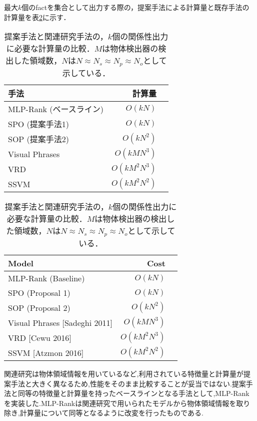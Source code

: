 最大$k$個のfactを集合として出力する際の，提案手法による計算量と既存手法の計算量を表\ref{table:calc-cost}に示す．
\begin{table}
\begin{center}
\caption{提案手法と関連研究手法の，$k$個の関係性出力に必要な計算量の比較．$M$は物体検出器の検出した領域数，$N$は$N \approx N_s \approx N_p \approx N_o$として示している．}
\label{table:calc-cost}
\begin{tabular}{lrr}
\toprule
手法 &  計算量 \\
\midrule
MLP-Rank (ベースライン)										&	$O(kN)$		\\
SPO	(提案手法1)												&	$O(kN)$		\\
SOP (提案手法2)												&	$O(kN^2)$	\\
\midrule
Visual Phrases\cite{Sadeghi2011}								&	$O(kMN^3)$  \\
VRD\cite{CewuLuRanjayKrishnaMichaelBernstein}				&	$O(kM^2N^3)$\\
SSVM\cite{Atzmon2016}										&	$O(kM^2N^2)$\\
\bottomrule
\end{tabular}
\end{center}
\end{table}
\begin{table}
\begin{center}
\caption{提案手法と関連研究手法の，$k$個の関係性出力に必要な計算量の比較．$M$は物体検出器の検出した領域数，$N$は$N \approx N_s \approx N_p \approx N_o$として示している．}
\label{table:calc-cost}
\begin{tabular}{lrr}
\toprule
Model &  Cost \\
\midrule
MLP-Rank (Baseline)										&	$O(kN)$		\\
SPO	(Proposal 1)												&	$O(kN)$		\\
SOP (Proposal 2)												&	$O(kN^2)$	\\
\midrule
Visual Phrases [Sadeghi 2011]								&	$O(kMN^3)$  \\
VRD [Cewu 2016]				&	$O(kM^2N^3)$\\
SSVM [Atzmon 2016]										&	$O(kM^2N^2)$\\
\bottomrule
\end{tabular}
\end{center}
\end{table}
関連研究は物体領域情報を用いているなど,利用されている特徴量と計算量が提案手法と大きく異なるため,性能をそのまま比較することが妥当ではない.提案手法と同等の特徴量と計算量を持ったベースラインとなる手法として,MLP-Rankを実装した.MLP-Rankは関連研究で用いられたモデルから物体領域情報を取り除き,計算量について同等となるように改変を行ったものである.

